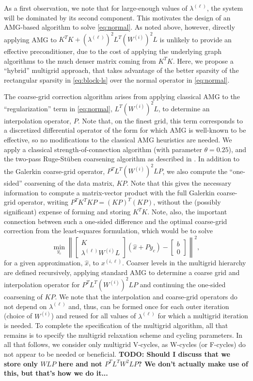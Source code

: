 As a first observation, we note that for large-enough values of
$\lambda^{(\ell)}$, the system will be dominated by its second
component.  This motivates the design of an AMG-based algorithm to
solve \eqref{eq:normal}.  As noted above, however, directly applying
AMG to $K^TK + \left(\lambda^{(\ell)}\right)^2
L^T\left(W^{(i)}\right)^2L$ is unlikely to provide an effective
preconditioner, due to the cost of applying the underlying graph
algorithms to the much denser matrix coming from $K^TK$.  Here, we
propose a ``hybrid'' multigrid approach, that takes advantage of the
better sparsity of the rectangular sparsity in \eqref{eq:block-ls}
over the normal operator in \eqref{eq:normal}.

The coarse-grid correction algorithm arises from applying classical
AMG to the ``regularization'' term in \eqref{eq:normal},
$L^T\left(W^{(i)}\right)^2L$, to determine an interpolation operator,
$P$.  Note that, on the finest grid, this term corresponds to a
discretized differential operator of the form for which AMG is
well-known to be effective, so no modifications to the classical AMG
heuristics are needed.  We apply a classical strength-of-connection
algorithm (with parameter $\theta = 0.25$), and the two-pass
Ruge-St\"uben coarsening algorithm as described
in \cite{JWRuge_KStuben_1987a}.  In addition to the Galerkin
coarse-grid operator, $P^TL^T\left(W^{(i)}\right)^2LP$, we also
compute the ``one-sided'' coarsening of the data matrix, $KP$.  Note
that this gives the necessary information to compute a matrix-vector
product with the full Galerkin coarse-grid operator, writing $P^TK^TKP
= (KP)^T(KP)$, without the (possibly significant) expense of forming
and storing $K^TK$.  Note, also, the important connection between such
a one-sided difference and the optimal coarse-grid correction from the
least-squares formulation, which would be to solve
\[
\min_{y_c}\left\| \left[\begin{array}{c} K \\ 
      \lambda^{(\ell)}W^{(i)}L\end{array}\right](\hat{x}+Py_c) - \left[\begin{array}{c} b \\ 0 \end{array}\right]\right\|^2,
\]
for a given approximation, $\hat{x}$, to $x^{(i,\ell)}$.  Coarser
levels in the multigrid hierarchy are defined recursively, applying
standard AMG to determine a coarse grid and interpolation operator for
$P^TL^T\left(W^{(i)}\right)^2LP$ and continuing the one-sided
coarsening of $KP$.  We note that the interpolation and coarse-grid
operators do not depend on $\lambda^{(\ell)}$ and, thus, can be formed
once for each outer iteration (choice of $W^{(i)}$) and reused for all
values of $\lambda^{(\ell)}$ for which a multigrid iteration is
needed.  To complete the specification of the multigrid algorithm, all
that remains is to specify the multigrid relaxation scheme and cycling
parameters.  In all that follows, we consider only multigrid V-cycles,
as W-cycles (or F-cycles) do not appear to be needed or beneficial.
{\bf TODO: Should I discuss that we store only $WLP$ here and not
$P^TL^TW^2LP$?  We don't actually make use of this, but that's how we
do it...}

